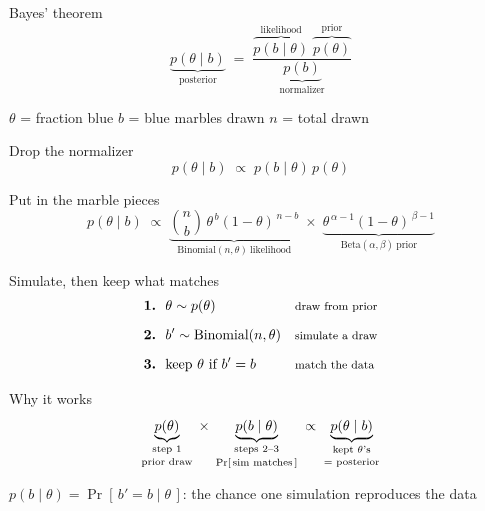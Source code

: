 \documentclass[aspectratio=169]{beamer}
\newcommand{\eqsize}{\fontsize{18}{22}\selectfont}
\begin{document}
\begin{frame}{Bayes' theorem}
  \vfill
  {\eqsize
  \[
    \underbrace{p(\theta \mid b)}_{\text{posterior}}
    \;=\;
    \frac{\overbrace{p(b \mid \theta)}^{\text{likelihood}}\;
          \overbrace{p(\theta)}^{\text{prior}}}
         {\underbrace{p(b)}_{\text{normalizer}}}
  \]}
  \vfill
  \begin{center}
    \small
    $\theta$ = fraction blue \qquad
    $b$ = blue marbles drawn \qquad
    $n$ = total drawn
  \end{center}
\end{frame}

\begin{frame}{Drop the normalizer}
  \vfill
  {\eqsize
  \[
    p(\theta \mid b)\;\propto\;p(b \mid \theta)\,p(\theta)
  \]}
  \vfill
\end{frame}

\begin{frame}{Put in the marble pieces}
  \vfill
  {\eqsize
  \[
    p(\theta \mid b)\;\propto\;
    \underbrace{\binom{n}{b}\,\theta^{\,b}(1-\theta)^{\,n-b}}
              _{\text{Binomial}(n,\theta)\ \text{likelihood}}
    \;\times\;
    \underbrace{\theta^{\,\alpha-1}(1-\theta)^{\,\beta-1}}
              _{\text{Beta}(\alpha,\beta)\ \text{prior}}
  \]}
  \vfill
\end{frame}

\begin{frame}{Simulate, then keep what matches}
  \vfill
  {\eqsize
  \[
    \begin{aligned}
      &\textbf{1.}\ \ \theta \sim p(\theta)
        && \text{\footnotesize draw from prior}\\[6pt]
      &\textbf{2.}\ \ b' \sim \text{Binomial}(n,\theta)
        && \text{\footnotesize simulate a draw}\\[6pt]
      &\textbf{3.}\ \ \text{keep } \theta \text{ if } b' = b
        && \text{\footnotesize match the data}
    \end{aligned}
  \]}
  \vfill
\end{frame}

\begin{frame}{Why it works}
  \vfill
  {\eqsize
  \[
    \underbrace{p(\theta)}_{\substack{\text{step 1}\\[2pt]\text{prior draw}}}
    \;\times\;
    \underbrace{p(b \mid \theta)}_{\substack{\text{steps 2--3}\\[2pt]\text{Pr[\,sim matches\,]}}}
    \;\propto\;
    \underbrace{p(\theta \mid b)}_{\substack{\text{kept }\theta\text{'s}\\[2pt]\text{= posterior}}}
  \]}
  \vfill
  \begin{center}
    \small
    $p(b \mid \theta) = \Pr[\,b' = b \mid \theta\,]$:
    the chance one simulation reproduces the data
  \end{center}
\end{frame}
\end{document}
